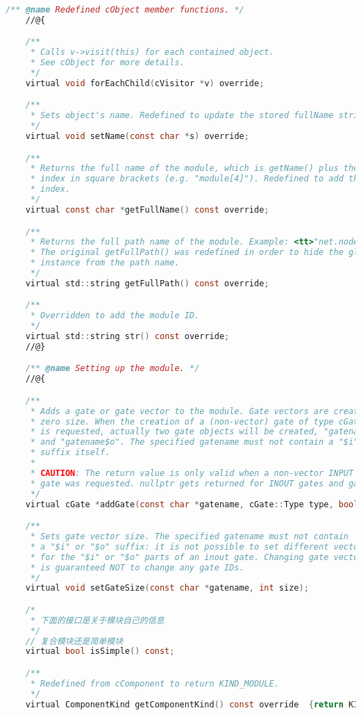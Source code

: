 \begin{lstlisting}[language=c,caption=My]
    /** @name Redefined cObject member functions. */
    //@{

    /**
     * Calls v->visit(this) for each contained object.
     * See cObject for more details.
     */
    virtual void forEachChild(cVisitor *v) override;

    /**
     * Sets object's name. Redefined to update the stored fullName string.
     */
    virtual void setName(const char *s) override;

    /**
     * Returns the full name of the module, which is getName() plus the
     * index in square brackets (e.g. "module[4]"). Redefined to add the
     * index.
     */
    virtual const char *getFullName() const override;

    /**
     * Returns the full path name of the module. Example: <tt>"net.node[12].gen"</tt>.
     * The original getFullPath() was redefined in order to hide the global cSimulation
     * instance from the path name.
     */
    virtual std::string getFullPath() const override;

    /**
     * Overridden to add the module ID.
     */
    virtual std::string str() const override;
    //@}

    /** @name Setting up the module. */
    //@{

    /**
     * Adds a gate or gate vector to the module. Gate vectors are created with
     * zero size. When the creation of a (non-vector) gate of type cGate::INOUT
     * is requested, actually two gate objects will be created, "gatename$i"
     * and "gatename$o". The specified gatename must not contain a "$i" or "$o"
     * suffix itself.
     *
     * CAUTION: The return value is only valid when a non-vector INPUT or OUTPUT
     * gate was requested. nullptr gets returned for INOUT gates and gate vectors.
     */
    virtual cGate *addGate(const char *gatename, cGate::Type type, bool isvector=false);

    /**
     * Sets gate vector size. The specified gatename must not contain
     * a "$i" or "$o" suffix: it is not possible to set different vector size
     * for the "$i" or "$o" parts of an inout gate. Changing gate vector size
     * is guaranteed NOT to change any gate IDs.
     */
    virtual void setGateSize(const char *gatename, int size);

    /*
     * 下面的接口是关于模块自己的信息
     */
    // 复合模块还是简单模块
    virtual bool isSimple() const;

    /**
     * Redefined from cComponent to return KIND_MODULE.
     */
    virtual ComponentKind getComponentKind() const override  {return KIND_MODULE;}


\end{lstlisting}
